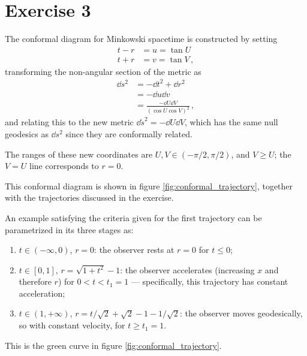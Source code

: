\documentclass[main.tex]{subfiles}
\begin{document}
\section*{Exercise 3}

The conformal diagram for Minkowski spacetime is constructed by setting 
%
\begin{align}
t - r &= u = \tan U  \\
t + r &= v = \tan V
\,,
\end{align}
%
transforming the non-angular section of the metric as 
%
\begin{align}
\dd{s^2} &= - \dd{t^2} + \dd{r^2}  \\
&= - \dd{u} \dd{v}  \\
&= \frac{- \dd{U} \dd{V}}{(\cos U \cos V)^2}
\,,
\end{align}
%
and relating this to the new metric \(\dd{\widetilde{s}}^2 = - \dd{U} \dd{V}\), which has the same null geodesics as \(\dd{s}^2\) since they are conformally related. 

The ranges of these new coordinates are \(U, V \in (- \pi /2, \pi /2)\), 
and \(V \geq U\); the \(V = U\) line corresponds to \(r = 0\). 

This conformal diagram is shown in figure 
\ref{fig:conformal_trajectory}, together with the trajectories discussed in the exercise. 

An example satisfying the criteria given for the first trajectory can be parametrized in its three stages as: 
\begin{enumerate}
    \item \(t \in (- \infty , 0)\), \(r = 0\): the observer rests at \(r = 0\) for \(t \leq 0\);
    \item \(t \in [0, 1]\), \(r = \sqrt{1 + t^2} - 1\): the observer accelerates (increasing \(x\) and therefore \(r\)) for \(0 < t < t_1 = 1\) --- specifically, this trajectory has constant acceleration;
    \item \(t \in (1, + \infty )\), \(r = t / \sqrt{2} + \sqrt{2} - 1 - 1 / \sqrt{2}\): the observer moves geodesically, so with constant velocity, for \(t \geq t_1 = 1\).
\end{enumerate}

This is the green curve in figure \ref{fig:conformal_trajectory}.
\end{document}
